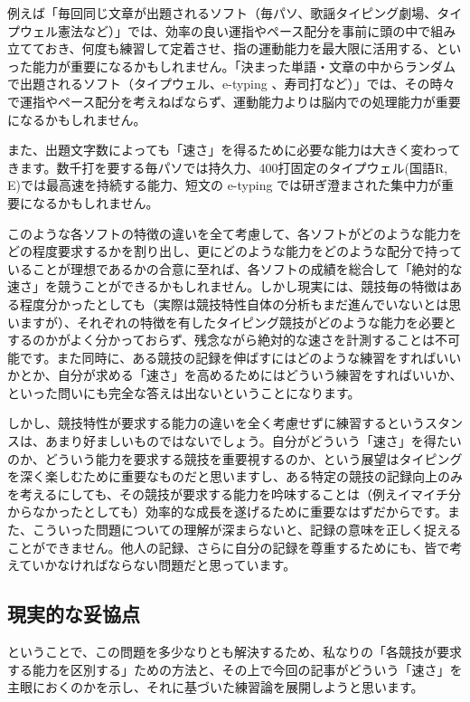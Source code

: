 例えば「毎回同じ文章が出題されるソフト（毎パソ、歌謡タイピング劇場、タイプウェル憲法など）」では、効率の良い運指やペース配分を事前に頭の中で組み立てておき、何度も練習して定着させ、指の運動能力を最大限に活用する、といった能力が重要になるかもしれません。「決まった単語・文章の中からランダムで出題されるソフト（タイプウェル、e-typing 、寿司打など）」では、その時々で運指やペース配分を考えねばならず、運動能力よりは脳内での処理能力が重要になるかもしれません。

また、出題文字数によっても「速さ」を得るために必要な能力は大きく変わってきます。数千打を要する毎パソでは持久力、400打固定のタイプウェル(国語R, E)では最高速を持続する能力、短文の e-typing では研ぎ澄まされた集中力が重要になるかもしれません。

このような各ソフトの特徴の違いを全て考慮して、各ソフトがどのような能力をどの程度要求するかを割り出し、更にどのような能力をどのような配分で持っていることが理想であるかの合意に至れば、各ソフトの成績を総合して「絶対的な速さ」を競うことができるかもしれません。しかし現実には、競技毎の特徴はある程度分かったとしても（実際は競技特性自体の分析もまだ進んでいないとは思いますが）、それぞれの特徴を有したタイピング競技がどのような能力を必要とするのかがよく分かっておらず、残念ながら絶対的な速さを計測することは不可能です。また同時に、ある競技の記録を伸ばすにはどのような練習をすればいいかとか、自分が求める「速さ」を高めるためにはどういう練習をすればいいか、といった問いにも完全な答えは出ないということになります。

しかし、競技特性が要求する能力の違いを全く考慮せずに練習するというスタンスは、あまり好ましいものではないでしょう。自分がどういう「速さ」を得たいのか、どういう能力を要求する競技を重要視するのか、という展望はタイピングを深く楽しむために重要なものだと思いますし、ある特定の競技の記録向上のみを考えるにしても、その競技が要求する能力を吟味することは（例えイマイチ分からなかったとしても）効率的な成長を遂げるために重要なはずだからです。また、こういった問題についての理解が深まらないと、記録の意味を正しく捉えることができません。他人の記録、さらに自分の記録を尊重するためにも、皆で考えていかなければならない問題だと思っています。

\subsection{現実的な妥協点}

ということで、この問題を多少なりとも解決するため、私なりの「各競技が要求する能力を区別する」ための方法と、その上で今回の記事がどういう「速さ」を主眼におくのかを示し、それに基づいた練習論を展開しようと思います。

